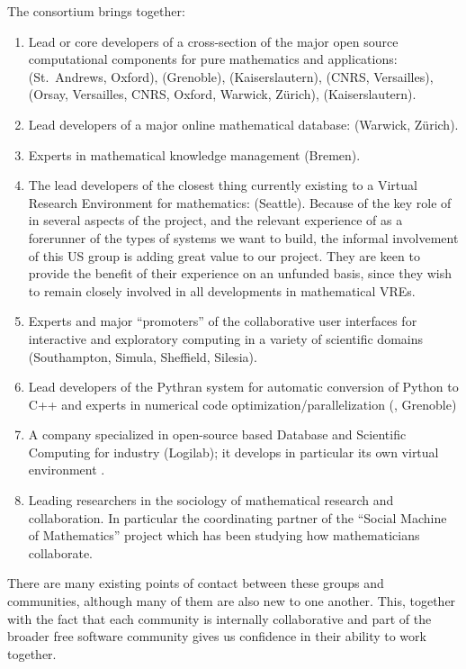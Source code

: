 The consortium brings together:
\begin{enumerate}
\item \label{mathsoftware} Lead or core developers of a cross-section of the major open
  source computational components for pure mathematics and applications: \GAP (St.~Andrews,
  Oxford), \Linbox (Grenoble), \MPIR (Kaiserslautern), \Pari (CNRS, Versailles), \Sage
  (Orsay, Versailles, CNRS, Oxford, Warwick, Zürich), \Singular (Kaiserslautern).
\item \label{mathdb} Lead developers of a major online mathematical database: \LMFDB
  (Warwick, Zürich).
\item \label{mathknowledge} Experts in mathematical knowledge management (Bremen).
\item \label{smc} The lead developers of the closest thing currently existing to a Virtual
  Research Environment for mathematics: \SMC (Seattle). Because of the key role of \Sage
  in several aspects of the project, and the relevant experience of \SMC as a forerunner of the types
  of systems we want to build, the informal involvement of this US group is adding great value to our project.
  They are keen to provide the benefit of their experience on an unfunded basis, since they wish to remain closely involved in
  all developments in mathematical VREs.
\item \label{jupyter} Experts and major ``promoters'' of the \Jupyter collaborative user
  interfaces for interactive and exploratory computing in a variety of scientific domains
  (Southampton, Simula, Sheffield, Silesia).
\item \label{pythran} Lead developers of the Pythran system for automatic conversion of
  Python to C++ and experts in numerical code optimization/parallelization (,
  Grenoble)
\item \label{logilab} A company specialized in open-source based Database and Scientific
  Computing for industry (Logilab); it develops in particular its own virtual environment
  \Simulagora.
\item \label{social} Leading researchers in the sociology of mathematical research and
  collaboration. In particular the coordinating partner of the ``Social Machine of
  Mathematics'' project which has been studying how mathematicians collaborate.
\end{enumerate}





There are many existing points of contact between these groups  and
communities, although many of them are also new to one another. This,
together with the fact that each community is internally collaborative
and part of the broader free software community gives us confidence in
their ability to work together.

